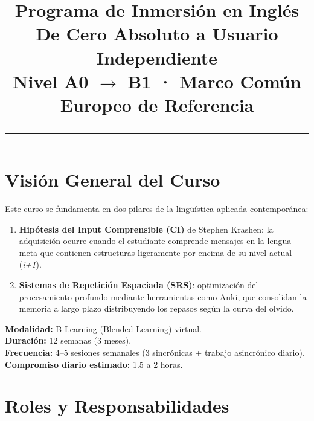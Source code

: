 \documentclass[12pt,a4paper]{article}
\title{%
  \vspace{-1cm}
  {\Huge\bfseries Programa de Inmersión en Inglés}\\[0.3cm]
  {\Large De Cero Absoluto a Usuario Independiente}\\[0.2cm]
  {\large\color{grissuave} Nivel A0 $\rightarrow$ B1 · Marco Común Europeo de Referencia}\\[0.5cm]
  \rule{\textwidth}{1.5pt}
}
\author{}
\date{}
\begin{document}
\maketitle
\thispagestyle{empty}

\vspace{-0.5cm}

\section*{Visión General del Curso}

\begin{cajafilosofia}
Este curso se fundamenta en dos pilares de la lingüística aplicada contemporánea:

\begin{enumerate}[leftmargin=1.5cm]
  \item \textbf{Hipótesis del Input Comprensible (CI)} de Stephen Krashen: la adquisición ocurre cuando el estudiante comprende mensajes en la lengua meta que contienen estructuras ligeramente por encima de su nivel actual (\textit{i+1}).

  \item \textbf{Sistemas de Repetición Espaciada (SRS)}: optimización del procesamiento profundo mediante herramientas como Anki, que consolidan la memoria a largo plazo distribuyendo los repasos según la curva del olvido.
\end{enumerate}

\medskip
\textbf{Modalidad:} B-Learning (Blended Learning) virtual.\\
\textbf{Duración:} 12 semanas (3 meses).\\
\textbf{Frecuencia:} 4--5 sesiones semanales (3 sincrónicas + trabajo asincrónico diario).\\
\textbf{Compromiso diario estimado:} 1.5 a 2 horas.
\end{cajafilosofia}

\section*{Roles y Responsabilidades}
\end{document}

